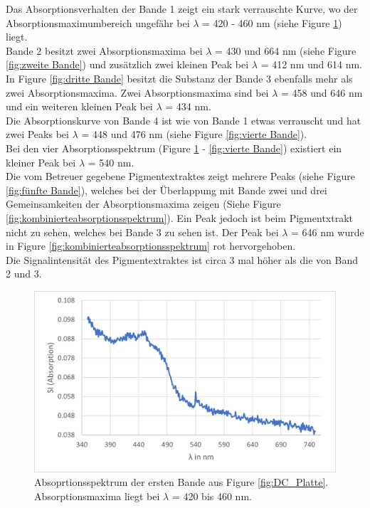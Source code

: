 \documentclass[10pt,a4paper]{article}
\begin{document}
			Das Absorptionsverhalten der Bande 1 zeigt ein stark verrauschte Kurve, wo der Absorptionsmaximumbereich ungefähr bei $\lambda$ = 420 - 460 nm (siehe Figure \ref{fig:erste Bande}) liegt.\\
			Bande 2 besitzt zwei Absorptionsmaxima bei $\lambda$ = 430 und 664 nm (siehe Figure \ref{fig:zweite Bande}) und zusätzlich zwei kleinen Peak bei  $\lambda$ = 412 nm und 614 nm.\\
			In Figure \ref{fig:dritte Bande}  besitzt die Substanz der Bande 3 ebenfalls mehr als zwei Absorptionsmaxima. Zwei Absorptionsmaxima sind bei $\lambda$ = 458 und 646 nm und ein weiteren kleinen Peak bei $\lambda$ = 434 nm.\\
			Die Absorptionskurve von Bande 4 ist wie von Bande 1 etwas verrauscht und hat zwei Peaks bei $\lambda$ = 448 und 476 nm (siehe Figure \ref{fig:vierte Bande}).\\
			Bei den vier Absorptionsspektrum (Figure \ref{fig:erste Bande} - \ref{fig:vierte Bande}) existiert ein kleiner Peak bei $\lambda$ = 540 nm.\\
			Die vom Betreuer gegebene Pigmentextraktes zeigt mehrere Peaks (siehe Figure \ref{fig:fünfte Bande}), welches bei der Überlappung mit Bande zwei und drei Gemeinsamkeiten der Absorptionsmaxima zeigen (Siehe Figure \ref{fig:kombinierteabsorptionsspektrum}). Ein Peak jedoch ist beim Pigmentxtrakt nicht zu sehen, welches bei Bande 3 zu sehen ist. Der Peak bei $\lambda$ = 646 nm wurde in Figure \ref{fig:kombinierteabsorptionsspektrum} rot hervorgehoben.\\
			Die Signalintensität des Pigmentextraktes ist circa 3 mal höher als die von Band 2 und 3.
			
			
			\begin{figure}[H]
				\centering
				\includegraphics[scale=1]{firstband_axischange.png}
				\caption{Absoprtionsspektrum der ersten Bande aus Figure \ref{fig:DC_Platte}. Absorptionsmaxima liegt bei $\lambda$ = 420 bis 460 nm.}
				\label{fig:erste Bande}
			\end{figure}
			
\end{document}

